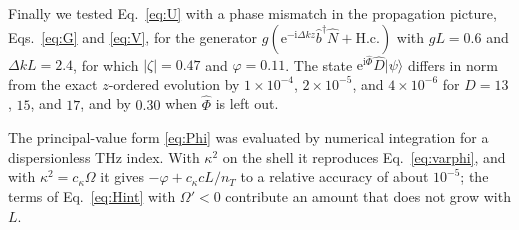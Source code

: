 \documentclass[aps,pra,reprint,superscriptaddress,amsmath,amssymb,floatfix]{revtex4-2}
\newcommand{\Nop}{\hat N}
\newcommand{\ee}{\mathrm{e}}
\newcommand{\ii}{\mathrm{i}}
\begin{document}
Finally we tested Eq.~\eqref{eq:U} with a phase mismatch in the propagation
picture, Eqs.~\eqref{eq:G} and \eqref{eq:V}, for the generator
$g(\ee^{-\ii\Delta kz}\hat b^\dagger\Nop+\mathrm{H.c.})$ with $gL=0.6$ and
$\Delta kL=2.4$, for which $|\zeta|=0.47$ and $\varphi=0.11$. The state
$\ee^{\ii\hat\Phi}\hat D|\psi\rangle$ differs in norm from the exact
$z$-ordered evolution by $1\times10^{-4}$, $2\times10^{-5}$, and
$4\times10^{-6}$ for $D=13$, $15$, and $17$, and by $0.30$ when $\hat\Phi$ is
left out.

The principal-value form \eqref{eq:Phi} was evaluated by numerical
integration for a dispersionless THz index. With $\kappa^2$ on the shell it
reproduces Eq.~\eqref{eq:varphi}, and with $\kappa^2=c_\kappa\Omega$ it gives
$-\varphi+c_\kappa cL/n_T$ to a relative accuracy of about $10^{-5}$; the terms of
Eq.~\eqref{eq:Hint} with $\Omega'<0$ contribute an amount that does not grow
with $L$.


\end{document}
